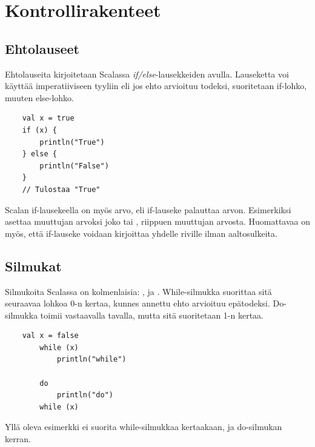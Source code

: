 \section{Kontrollirakenteet}

\subsection{Ehtolauseet}
Ehtolauseita kirjoitetaan Scalassa \textit{if/else}-lausekkeiden avulla. Lauseketta voi käyttää imperatiiviseen tyyliin eli jos ehto arvioituu todeksi, suoritetaan if-lohko, muuten else-lohko.
\begin{lstlisting}
    val x = true
    if (x) {
        println("True")
    } else {
        println("False")
    }
    // Tulostaa "True"
\end{lstlisting}
Scalan if-lausekeella on myös arvo, eli if-lauseke palauttaa arvon. Esimerkiksi \newline {} asettaa muuttujan  arvoksi joko  tai , riippuen muuttujan  arvosta. Huomattavaa on myös, että if-lauseke voidaan kirjoittaa yhdelle riville ilman aaltosulkeita.
\cite[Luku 2.1]{scalaForTheImpatient}
        
\subsection{Silmukat}
Silmukoita Scalassa on kolmenlaisia: ,  ja . While-silmukka suorittaa sitä seuraavaa lohkoa 0-n kertaa, kunnes annettu ehto arvioituu epätodeksi. Do-silmukka toimii vastaavalla tavalla, mutta sitä suoritetaan 1-n kertaa.
\begin{lstlisting}
    val x = false
		while (x)
			println("while")
		
		do
			println("do")
        while (x)
\end{lstlisting}
Yllä oleva esimerkki ei suorita while-silmukkaa kertaakaan, ja do-silmukan kerran.
\cite[Luku 2.5]{scalaForTheImpatient}

